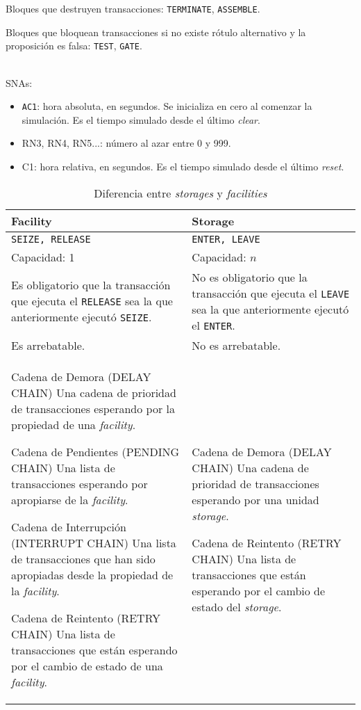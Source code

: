 \documentclass[12pt, a4paper, twoside]{paquetes-apunte/apunte}
\providecommand{\tabularnewline}{\\}
\begin{document}
Bloques que destruyen transacciones: \texttt{TERMINATE}, \texttt{ASSEMBLE}.

Bloques que bloquean transacciones si no existe rótulo alternativo
y la proposición es falsa: \texttt{TEST}, \texttt{GATE}.

~\\

SNAs:
\begin{itemize}
  \item \texttt{AC1}: hora absoluta, en segundos. Se inicializa en cero al
    comenzar la simulación. Es el tiempo simulado desde el último \emph{clear}.
  \item RN3, RN4, RN5...: número al azar entre 0 y 999.
  \item C1: hora relativa, en segundos. Es el tiempo simulado desde el último
    \emph{reset}.
\end{itemize}

\begin{table}[h]
  \centering
  \begin{tabular}{| >{\centering}p{} | >{\centering}p{} |}
    \hline
    \textbf{Facility} & \textbf{Storage} \tabularnewline
    \hline
    \hline
    \texttt{SEIZE, RELEASE} & \texttt{ENTER, LEAVE} \tabularnewline
    \hline
    Capacidad: 1 & Capacidad: $n$ \tabularnewline
    \hline
    Es obligatorio que la transacción que ejecuta el \texttt{RELEASE}
    sea la que anteriormente ejecutó \texttt{SEIZE}. &
    No es obligatorio que la transacción que ejecuta el \texttt{LEAVE}
    sea la que anteriormente ejecutó el \texttt{ENTER}. \tabularnewline
    \hline
    Es arrebatable. & No es arrebatable. \tabularnewline
    \hline
    Cadena de Demora (DELAY CHAIN) \textendash{} Una cadena de prioridad
    de transacciones esperando por la propiedad de una \emph{facility}.

    Cadena de Pendientes (PENDING CHAIN) \textendash{} Una lista de transacciones
    esperando por apropiarse de la \emph{facility}.

    Cadena de Interrupción (INTERRUPT CHAIN) \textendash{} Una lista de
    transacciones que han sido apropiadas desde la propiedad de la \emph{facility}.

    Cadena de Reintento (RETRY CHAIN) \textendash{} Una lista de transacciones
    que están esperando por el cambio de estado de una \emph{facility}. &

    Cadena de Demora (DELAY CHAIN) \textendash{} Una cadena de prioridad
    de transacciones esperando por una unidad \emph{storage}.

    Cadena de Reintento (RETRY CHAIN) \textendash{} Una lista de transacciones
    que están esperando por el cambio de estado del \emph{storage}. \tabularnewline
    \hline
  \end{tabular}
  \caption{Diferencia entre \emph{storages} y \emph{facilities}}
\end{table}
\end{document}

